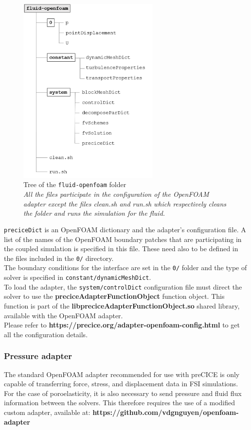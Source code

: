 \documentclass[oneside,11pt,times]{book}
\begin{document}
\begin{figure}[H]
    \centering
    \includegraphics[width=7cm]{imgs/Illustrations/arborescence.png}
    \caption{Tree of the \texttt{fluid-openfoam} folder\\ \emph{All the files participate in the configuration of the OpenFOAM adapter except the files clean.sh and run.sh which respectively cleans the folder and runs the simulation for the fluid.}}
    \label{arborescence}
\end{figure}

\texttt{preciceDict} is an OpenFOAM dictionary and the adapter’s configuration file. A list of the names of the OpenFOAM boundary patches that are participating in the coupled simulation is specified in this file. These need also to be defined in the files included in the \texttt{0/} directory.\\

The boundary conditions for the interface are set in the \texttt{0/} folder and the type of solver is specified in \texttt{constant/dynamicMeshDict}.\\

To load the adapter, the \texttt{system/controlDict} configuration file must direct the solver to use the \textbf{preciceAdapterFunctionObject} function object. This function is part of the \textbf{libpreciceAdapterFunctionObject.so} shared library, available with the OpenFOAM adapter.\\

Please refer to \textbf{https://precice.org/adapter-openfoam-config.html} to get all the configuration details.
\subsubsection{Pressure adapter}
The standard OpenFOAM adapter recommended for use with preCICE is only capable of transferring force, stress, and displacement data in FSI simulations. For the case of poroelasticity, it is also necessary to send pressure and fluid flux information between the solvers. This therefore requires the use of a modified custom adapter, available at: \textbf{https://github.com/vdgnguyen/openfoam-adapter}
\end{document}
